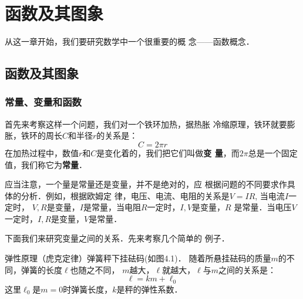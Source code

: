 \chapter{函数及其图象}

从这一章开始，我们要研究数学中一个很重要的概
念——函数概念．
\section{函数及其图象}
\subsection{常量、变量和函数}
首先来考察这样一个问题，我们对一个铁环加热，据热胀
冷缩原理，铁环就要膨胀，铁环的周长$C$和半径$r$的关系是：
\[C=2\pi r\]
在加热过程中，数值$r$和$C$是变化着的，我们把它们叫做\textbf{变
量}，而$2\pi$总是一个固定值，我们称它为\textbf{常量}．

应当注意，一个量是常量还是变量，并不是绝对的，应
根据问题的不同要求作具体的分析．例如，根据欧姆定
律，电压、电流、电阻的关系是$V=IR$, 当电流$I$一定时，
$V,R$是变量，$I$是常量，当电阻$R$一定时，$I,V$是变量，$R$
是常量．当电压$V$一定时，$I,R$是变量，$V$是常量．

下面我们来研究变量之间的关系．先来考察几个简单的
例子．


\begin{example}
    弹性原理（虎克定律）弹簧秤下挂砝码(如图4.1)．
随着所悬挂砝码的质量$m$的不同，弹簧的长度$\ell$也随之不同，
$m$越大，$\ell$就越大，$\ell$与$m$之间的关系是：
\[\ell=km+\ell_0\]
这里$\ell_0$是$m=0$时弹簧长度，$k$是秤的弹性系数．
\end{example}

\begin{figure}[htp]
    \centering
 \caption{}
\end{figure}

